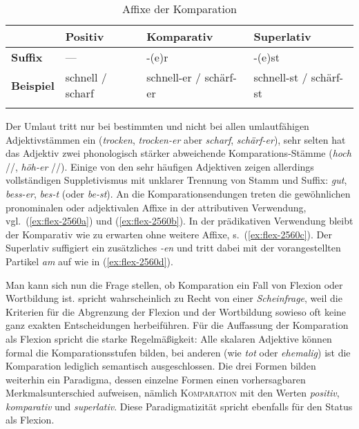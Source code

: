 \begin{table}[!h]
  \centering
  \begin{tabular}{llll}
    \lsptoprule
     & \textbf{Positiv} & \textbf{Komparativ} & \textbf{Superlativ} \\
     \midrule
     \textbf{Suffix} & --- & -(e)r & -(e)st \\
     \textbf{Beispiel} & schnell / scharf & schnell-er / schärf-er & schnell-st / schärf-st \\
     \lspbottomrule
  \end{tabular}
  \caption{Affixe der Komparation}
  \label{tab:komparation}
\end{table}

Der Umlaut tritt nur bei bestimmten und nicht bei allen umlautfähigen Adjektivstämmen ein (\textit{trocken}, \textit{trocken-er} aber \textit{scharf}, \textit{schärf-er}), sehr selten hat das Adjektiv zwei phonologisch stärker abweichende Komparations-Stämme (\textit{hoch} //, \textit{höh-er} //).
Einige von den sehr häufigen Adjektiven zeigen allerdings vollständigen Suppletivismus mit unklarer Trennung von Stamm und Suffix: \textit{gut}, \textit{bess-er}, \textit{bes-t} (oder \textit{be-st}).
An die Komparationsendungen treten die gewöhnlichen pronominalen oder adjektivalen Affixe in der attributiven Verwendung, vgl.\ (\ref{ex:flex-2560a}) und (\ref{ex:flex-2560b}).
In der prädikativen Verwendung bleibt der Komparativ wie zu erwarten ohne weitere Affixe, s.\ (\ref{ex:flex-2560c}).
Der Superlativ suffigiert ein zusätzliches \textit{-en} und tritt dabei mit der vorangestellten Partikel \textit{am} auf wie in (\ref{ex:flex-2560d}).

\begin{exe}
  \ex \label{ex:flex2560}
  \begin{xlist}
  \end{xlist}
\end{exe}


Man kann sich nun die Frage stellen, ob Komparation ein Fall von Flexion oder Wortbildung ist.
\citet[177]{Eisenberg1} spricht wahrscheinlich zu Recht von einer \textit{Scheinfrage}, weil die Kriterien für die Abgrenzung der Flexion und der Wortbildung sowieso oft keine ganz exakten Entscheidungen herbeiführen.
Für die Auffassung der Komparation als Flexion spricht die starke Regelmäßigkeit:
Alle skalaren Adjektive können formal die Komparationsstufen bilden, bei anderen (wie \textit{tot} oder \textit{ehemalig}) ist die Komparation lediglich semantisch ausgeschlossen.
Die drei Formen bilden weiterhin ein Paradigma, dessen einzelne Formen einen vorhersagbaren Merkmalsunterschied aufweisen, nämlich \textsc{Komparation} mit den Werten \textit{positiv}, \textit{komparativ} und \textit{superlativ}.
Diese Paradigmatizität spricht ebenfalls für den Status als Flexion.

